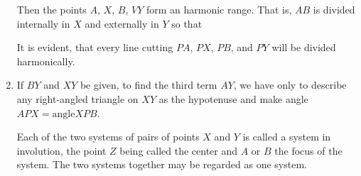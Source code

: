 \begin{enumerate}
    Then the points $A$, $X$, $B$, $VY$ form an harmonic range. That is, $AB$ is
    divided internally in $X$ and externally in $Y$ so that


    It is evident, that every line cutting $PA$, $PX$, $PB$, and $PY$ will be
    divided harmonically.


%
%
%
%

\item If $BY$ and $XY$ be given, to find the third term $AY$, we have only to
    describe any right-angled triangle on $XY$ as the hypotenuse and make angle
    $APX = \text{angle} XPB$.


%
%
%
%
%
%
%
%
%
%
    Each of the two systems of pairs of points $X$ and $Y$ is called a system in
    involution, the point $Z$ being called the center and $A$ or $B$ the focus
    of the system.  The two systems together may be regarded as one system.


\end{enumerate}

